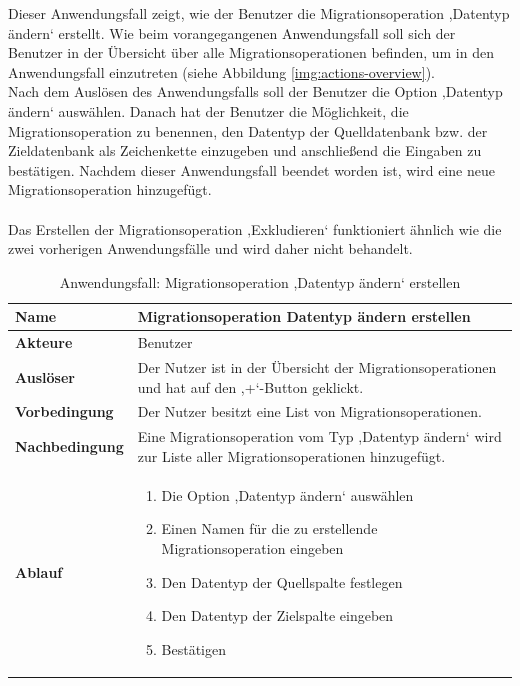 Dieser Anwendungsfall zeigt, wie der Benutzer die Migrationsoperation ,Datentyp ändern‘ erstellt. Wie beim vorangegangenen Anwendungsfall soll sich der Benutzer in der Übersicht über alle Migrationsoperationen befinden, um in den Anwendungsfall einzutreten (siehe Abbildung \ref{img:actions-overview}).\\
Nach dem Auslösen des Anwendungsfalls soll der Benutzer die Option ‚Datentyp ändern‘ auswählen. Danach hat der Benutzer die Möglichkeit, die Migrationsoperation zu benennen, den Datentyp der Quelldatenbank bzw. der Zieldatenbank als Zeichenkette einzugeben und anschließend die Eingaben zu bestätigen. Nachdem dieser Anwendungsfall beendet worden ist, wird eine neue Migrationsoperation hinzugefügt.\\ \\
Das Erstellen der Migrationsoperation ‚Exkludieren‘ funktioniert ähnlich wie die zwei vorherigen Anwendungsfälle und wird daher nicht behandelt.
\begin{table}[H]
	\centering
	\caption{Anwendungsfall: Migrationsoperation ,Datentyp ändern‘ erstellen}
	\begin{tabular}{ |p{4cm}|p{8cm}| }
		\hline
		\textbf{Name} &  Migrationsoperation Datentyp ändern erstellen \\
		\hline
		\textbf{Akteure} & Benutzer  \\
		\hline
		\textbf{Auslöser} & Der Nutzer ist in der Übersicht der Migrationsoperationen und hat auf den ,+‘-Button geklickt. \\
		\hline
		\textbf{Vorbedingung} & Der Nutzer besitzt eine List von Migrationsoperationen.  \\
		\hline
		\textbf{Nachbedingung} & Eine Migrationsoperation vom Typ ,Datentyp ändern‘ wird zur Liste aller Migrationsoperationen hinzugefügt.  \\
		\hline
		\textbf{Ablauf} & 
		\begin{enumerate}
			\item Die Option ,Datentyp ändern‘ auswählen
			\item Einen Namen für die zu erstellende Migrationsoperation eingeben
			\item Den Datentyp der Quellspalte festlegen
			\item Den Datentyp der Zielspalte eingeben
			\item Bestätigen
		\end{enumerate}   \\
		\hline
		
	\end{tabular}
	\label{table:datentyp-ändern}
\end{table}

